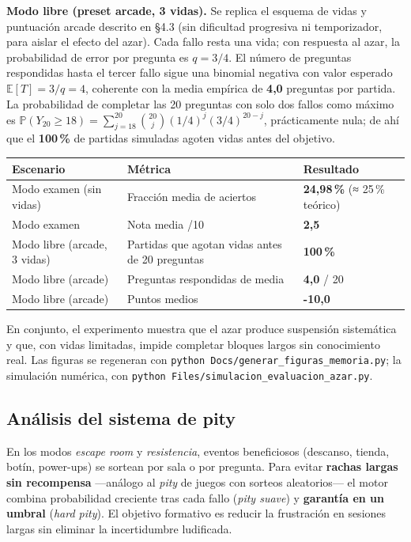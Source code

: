 \documentclass[11pt,a4paper]{article}
\newcommand{\iniciotabla}{\par\medskip\renewcommand{\arraystretch}{1.12}}
\newcommand{\fintabla}{\par\medskip}
\begin{document}
\textbf{Modo libre (preset arcade, 3 vidas).} Se replica el esquema de vidas y puntuación arcade descrito en §4.3 (sin dificultad progresiva ni temporizador, para aislar el efecto del azar). Cada fallo resta una vida; con respuesta al azar, la probabilidad de error por pregunta es $q = 3/4$. El número de preguntas respondidas hasta el tercer fallo sigue una binomial negativa con valor esperado $\mathbb{E}[T] = 3/q = 4$, coherente con la media empírica de \textbf{4,0} preguntas por partida. La probabilidad de completar las 20 preguntas con solo dos fallos como máximo es $\mathbb{P}(Y_{20} \geq 18) = \sum_{j=18}^{20}\binom{20}{j}(1/4)^j(3/4)^{20-j}$, prácticamente nula; de ahí que el \textbf{100\,\%} de partidas simuladas agoten vidas antes del objetivo.

\iniciotabla
\begin{tabular}{@{}lll@{}}
\toprule
\textbf{Escenario} & \textbf{Métrica} & \textbf{Resultado} \\
\midrule
Modo examen (sin vidas) & Fracción media de aciertos & \textbf{24,98\,\%} (≈ 25\,\% teórico) \\
Modo examen & Nota media /10 & \textbf{2,5} \\
Modo libre (arcade, 3 vidas) & Partidas que agotan vidas antes de 20 preguntas & \textbf{100\,\%} \\
Modo libre (arcade) & Preguntas respondidas de media & \textbf{4,0} / 20 \\
Modo libre (arcade) & Puntos medios & \textbf{-10,0} \\
\bottomrule
\end{tabular}
\label{tab:mc-resultados}
\fintabla

En conjunto, el experimento muestra que el azar produce suspensión sistemática y que, con vidas limitadas, impide completar bloques largos sin conocimiento real. Las figuras se regeneran con \texttt{python Docs/generar\_figuras\_memoria.py}; la simulación numérica, con \texttt{python Files/simulacion\_evaluacion\_azar.py}.

\subsection{Análisis del sistema de pity}

En los modos \emph{escape room} y \emph{resistencia}, eventos beneficiosos (descanso, tienda, botín, power-ups) se sortean por sala o por pregunta. Para evitar \textbf{rachas largas sin recompensa} ---análogo al \emph{pity} de juegos con sorteos aleatorios--- el motor combina probabilidad creciente tras cada fallo (\emph{pity suave}) y \textbf{garantía en un umbral} (\emph{hard pity}). El objetivo formativo es reducir la frustración en sesiones largas sin eliminar la incertidumbre ludificada.
\end{document}
